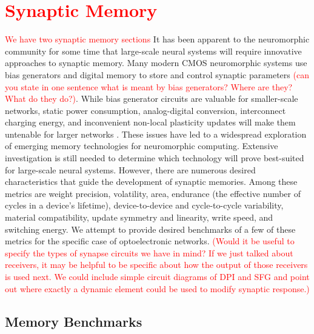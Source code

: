 \documentclass[twocolumn]{article}
\begin{document}
\section{\textcolor{Red}{Synaptic Memory}}
\textcolor{Red}{We have two synaptic memory sections}
It has been apparent to the neuromorphic community for some time that large-scale neural systems will require innovative approaches to synaptic memory. Many modern CMOS neuromorphic systems use bias generators and digital memory to store and control synaptic parameters \cite{ref_required} \textcolor{red}{(can you state in one sentence what is meant by bias generators? Where are they? What do they do?)}. While bias generator circuits are valuable for smaller-scale networks, static power consumption, analog-digital conversion, interconnect charging energy, and inconvenient non-local plasticity updates will make them untenable for larger networks \cite{dalgaty2019hybrid}. These issues have led to a widespread exploration of emerging memory technologies for neuromorphic computing. Extensive investigation is still needed to determine which technology will prove best-suited for large-scale neural systems. However, there are numerous desired characteristics that guide the development of synaptic memories. Among these metrics are weight precision, volatility, area, endurance (the effective number of cycles in a device's lifetime), device-to-device and cycle-to-cycle variability, material compatibility, update symmetry and linearity, write speed, and switching energy. We attempt to provide desired benchmarks of a few of these metrics for the specific case of optoelectronic networks. \textcolor{red}{(Would it be useful to specify the types of synapse circuits we have in mind? If we just talked about receivers, it may be helpful to be specific about how the output of those receivers is used next. We could include simple circuit diagrams of DPI and SFG and point out where exactly a dynamic element could be used to modify synaptic response.)}
\subsection{Memory Benchmarks}
\end{document}
